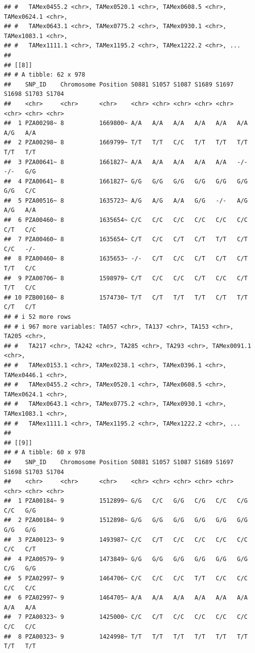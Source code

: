 \documentclass[
]{article}
\begin{document}
\begin{verbatim}
## #   TAMex0455.2 <chr>, TAMex0520.1 <chr>, TAMex0608.5 <chr>, TAMex0624.1 <chr>,
## #   TAMex0643.1 <chr>, TAMex0775.2 <chr>, TAMex0930.1 <chr>, TAMex1083.1 <chr>,
## #   TAMex1111.1 <chr>, TAMex1195.2 <chr>, TAMex1222.2 <chr>, ...
## 
## [[8]]
## # A tibble: 62 x 978
##    SNP_ID    Chromosome Position S0881 S1057 S1087 S1689 S1697 S1698 S1703 S1704
##    <chr>     <chr>      <chr>    <chr> <chr> <chr> <chr> <chr> <chr> <chr> <chr>
##  1 PZA00298~ 8          1669800~ A/A   A/A   A/A   A/A   A/A   A/A   A/G   A/A  
##  2 PZA00298~ 8          1669799~ T/T   T/T   C/C   T/T   T/T   T/T   T/T   T/T  
##  3 PZA00641~ 8          1661827~ A/A   A/A   A/A   A/A   A/A   -/-   -/-   G/G  
##  4 PZA00641~ 8          1661827~ G/G   G/G   G/G   G/G   G/G   G/G   G/G   C/C  
##  5 PZA00516~ 8          1635723~ A/G   A/G   A/A   G/G   -/-   A/G   A/G   A/A  
##  6 PZA00460~ 8          1635654~ C/C   C/C   C/C   C/C   C/C   C/C   C/T   C/C  
##  7 PZA00460~ 8          1635654~ C/T   C/C   C/T   C/T   T/T   C/T   C/C   -/-  
##  8 PZA00460~ 8          1635653~ -/-   C/T   C/C   C/T   C/T   C/T   T/T   C/C  
##  9 PZA00706~ 8          1598979~ C/T   C/C   C/C   C/T   C/C   C/T   T/T   C/C  
## 10 PZB00160~ 8          1574730~ T/T   C/T   T/T   T/T   C/T   T/T   C/T   C/T  
## # i 52 more rows
## # i 967 more variables: TA057 <chr>, TA137 <chr>, TA153 <chr>, TA205 <chr>,
## #   TA217 <chr>, TA242 <chr>, TA285 <chr>, TA293 <chr>, TAMex0091.1 <chr>,
## #   TAMex0153.1 <chr>, TAMex0238.1 <chr>, TAMex0396.1 <chr>, TAMex0446.1 <chr>,
## #   TAMex0455.2 <chr>, TAMex0520.1 <chr>, TAMex0608.5 <chr>, TAMex0624.1 <chr>,
## #   TAMex0643.1 <chr>, TAMex0775.2 <chr>, TAMex0930.1 <chr>, TAMex1083.1 <chr>,
## #   TAMex1111.1 <chr>, TAMex1195.2 <chr>, TAMex1222.2 <chr>, ...
## 
## [[9]]
## # A tibble: 60 x 978
##    SNP_ID    Chromosome Position S0881 S1057 S1087 S1689 S1697 S1698 S1703 S1704
##    <chr>     <chr>      <chr>    <chr> <chr> <chr> <chr> <chr> <chr> <chr> <chr>
##  1 PZA00184~ 9          1512899~ G/G   C/C   G/G   C/G   C/C   C/G   C/C   G/G  
##  2 PZA00184~ 9          1512898~ G/G   G/G   G/G   G/G   G/G   G/G   G/G   G/G  
##  3 PZA00123~ 9          1493987~ C/C   C/T   C/C   C/C   C/C   C/C   C/C   C/T  
##  4 PZA00579~ 9          1473849~ G/G   G/G   G/G   G/G   G/G   G/G   C/G   G/G  
##  5 PZA02997~ 9          1464706~ C/C   C/C   C/C   T/T   C/C   C/C   C/C   C/C  
##  6 PZA02997~ 9          1464705~ A/A   A/A   A/A   A/A   A/A   A/A   A/A   A/A  
##  7 PZA00323~ 9          1425000~ C/C   C/T   C/C   C/C   C/C   C/C   C/C   C/C  
##  8 PZA00323~ 9          1424998~ T/T   T/T   T/T   T/T   T/T   T/T   T/T   T/T  

\end{verbatim}
\end{document}
